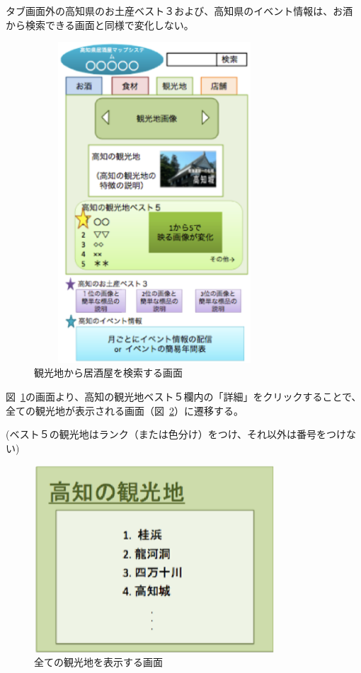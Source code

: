 \documentclass[a4j,titlepage]{jarticle}
\begin{document}
タブ画面外の高知県のお土産ベスト３および、高知県のイベント情報は、お酒から検索できる画面と同様で変化しない。
\clearpage
\begin {figure}[!htbp]
    \begin{center}
    \includegraphics [height=12cm, width=9cm]{12.eps}
    \caption {観光地から居酒屋を検索する画面}
    \label {fig:12}
    \end{center}
\end {figure}

図~\ref{fig:12}の画面より、高知の観光地ベスト５欄内の「詳細」をクリックすることで、全ての観光地が表示される画面（図~\ref{fig:13}）に遷移する。

(ベスト５の観光地はランク（または色分け）をつけ、それ以外は番号をつけない)
\clearpage
\begin {figure}[!htbp]
    \begin{center}
    \includegraphics [height=7cm, width=9cm]{13.eps}
    \caption {全ての観光地を表示する画面}
    \label {fig:13}
    \end{center}
\end {figure}
\end{document}
